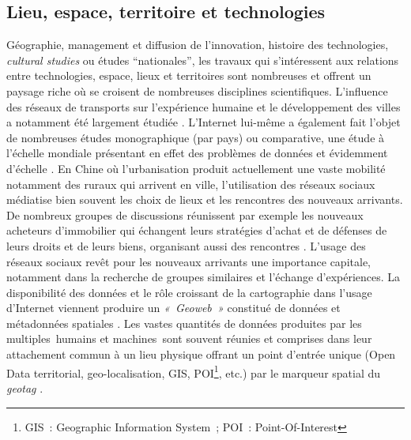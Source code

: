 \subsection[Lieu, espace, territoire et technologies]{Lieu, espace, territoire et technologies}
Géographie, management et diffusion de l’innovation, histoire des technologies, \textit{cultural studies} ou études “nationales”, les travaux qui s’intéressent aux relations entre technologies, espace, lieux et territoires sont nombreuses et offrent un paysage riche où se croisent de nombreuses disciplines scientifiques. L’influence des réseaux de transports sur l’expérience humaine et le développement des villes a notamment été largement étudiée \citep{Offner1993,Doulet2001}. L’Internet lui-même a également fait l’objet de nombreuses études monographique (par pays) ou comparative, une étude à l’échelle mondiale présentant en effet des problèmes de données et évidemment d’échelle \citep{Dupuy2004}. En Chine où l'urbanisation produit actuellement une vaste mobilité notamment des ruraux qui arrivent en ville, l'utilisation des réseaux sociaux médiatise bien souvent les choix de lieux et les rencontres des nouveaux arrivants. De nombreux groupes de discussions réunissent par exemple les nouveaux acheteurs d’immobilier qui échangent leurs stratégies d’achat et de défenses de leurs droits et de leurs biens, organisant aussi des rencontres \citep{Li2013}. L’usage des réseaux sociaux revêt pour les nouveaux arrivants une importance capitale, notamment dans la recherche de groupes similaires et l’échange d’expériences. La disponibilité des données et le rôle croissant de la cartographie dans l’usage d’Internet viennent produire un \textit{« Geoweb »} constitué de données et métadonnées spatiales \citep{Crampton2009}. Les vastes quantités de données produites par les multiples humains et machines sont souvent réunies et comprises dans leur attachement commun à un lieu physique \citep{Torrens2010} offrant un point d'entrée unique (Open Data territorial, geo-localisation, GIS, POI\footnote{GIS : Geographic Information System ; POI : Point-Of-Interest}, etc.) par le marqueur spatial du \textit{geotag} \citep{Crampton2013}.

